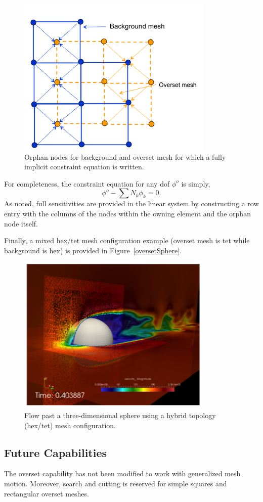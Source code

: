 \begin{figure} [h]
\centerline{\includegraphics[height=3.0in]{images/oversetNodes}}
\vspace{0.1in}
\caption{Orphan nodes for background and overset mesh for which a fully 
implicit constraint equation is written.}
\label{oversetNodes}
\end{figure}

For completeness, the constraint equation for any dof $\phi^o$ is simply,
\begin{equation}
  \phi^o - \sum N_k \phi_k = 0.
\label{constraint}
\end{equation}
As noted, full sensitivities are provided in the linear system by constructing
a row entry with the columns of the nodes within the owning element and the
orphan node itself.

Finally, a mixed hex/tet mesh configuration example (overset mesh is tet 
while background is hex) is provided in Figure~\ref{oversetSphere}.

\begin{figure} [h]
\centerline{\includegraphics[height=3.0in]{images/oversetSphere}}
\vspace{0.1in}
\caption{Flow past a three-dimensional sphere using a hybrid topology 
(hex/tet) mesh configuration.}
\label{oversetHC}
\end{figure}

\subsection{Future Capabilities}

The overset capability has not been modified to work with generalized mesh
motion. Moreover, search and cutting is reserved for simple squares and 
rectangular overset meshes.


